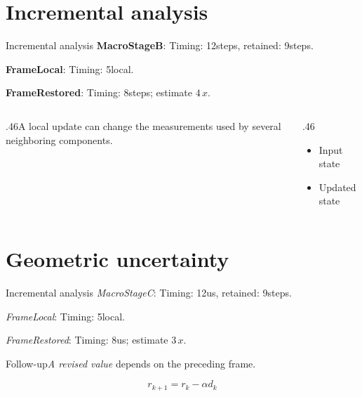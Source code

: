 \documentclass[12pt,aspectratio=43]{beamer}
\newcommand{\fuzzlayerA}[1]{\textbf{#1}}
\newcommand{\fuzzlayerB}[1]{\fuzzlayerA{#1}}
\newcommand{\fuzzlayerC}[1]{\fuzzlayerB{#1}}
\newcommand{\fuzzterm}[1]{\fuzzlayerC{#1}}
\newcommand{\fuzzpair}[2]{\fuzzterm{#1}: #2}
\newcommand{\fuzzunit}{steps}
\let\fuzzoriginalunit\fuzzunit
\newcommand{\fuzzcoefficient}{4}
\newcommand{\fuzzscale}[2][\fuzzcoefficient]{#1\,#2}
\begin{document}
\section{Incremental analysis}
\begin{frame}[t]{Incremental analysis}
\fuzzpair{MacroStageB}{Timing: 12\fuzzunit, retained: 9\fuzzoriginalunit.}\par
{\renewcommand{\fuzzunit}{local}\fuzzpair{FrameLocal}{Timing: 5\fuzzunit.}\par}
\fuzzpair{FrameRestored}{Timing: 8\fuzzunit; estimate $\fuzzscale{x}$.}\par
\begin{columns}[T]\begin{column}{.46\textwidth}A local update can change the measurements used by several neighboring components.\end{column}\begin{column}{.46\textwidth}\begin{itemize}\item Input state\item Updated state\end{itemize}\end{column}\end{columns}
\end{frame}
\renewcommand{\fuzzunit}{us}
\renewcommand{\fuzzcoefficient}{3}
\renewcommand{\fuzzterm}[1]{{\textit{#1}}}
\section{Geometric uncertainty}
\begin{frame}[t]{Incremental analysis}
\fuzzpair{MacroStageC}{Timing: 12\fuzzunit, retained: 9\fuzzoriginalunit.}\par
{\renewcommand{\fuzzunit}{local}\fuzzpair{FrameLocal}{Timing: 5\fuzzunit.}\par}
\fuzzpair{FrameRestored}{Timing: 8\fuzzunit; estimate $\fuzzscale{x}$.}\par
\begin{block}{Follow-up}\fuzzterm{A revised value} depends on the preceding frame.\end{block}
\[r_{k+1}=r_k-\alpha d_k\]
\end{frame}
\renewcommand{\fuzzunit}{s}
\renewcommand{\fuzzcoefficient}{4}
\renewcommand{\fuzzterm}[1]{{\textit{#1}}}
\end{document}
